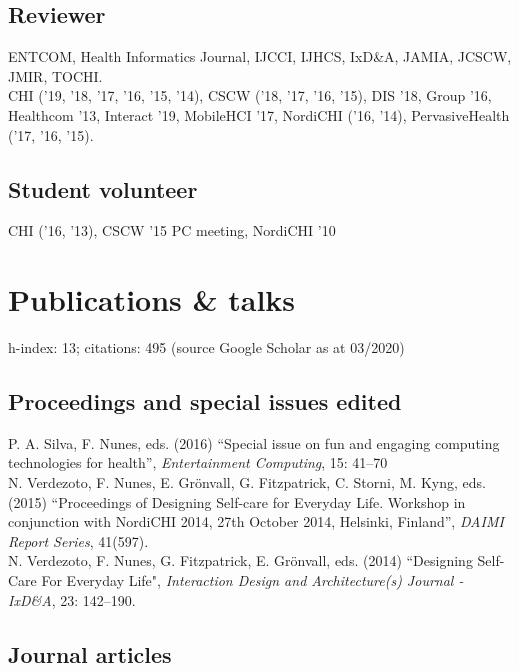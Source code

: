 \documentclass[11pt, a4paper]{article} %
\newcommand{\years}[1]{\marginnote{\scriptsize #1}} %
\begin{document}
\subsection*{Reviewer}

ENTCOM, Health Informatics Journal, IJCCI, IJHCS, IxD\&A, JAMIA, JCSCW, JMIR, TOCHI.\\
CHI ('19, '18, '17, '16, '15, '14), CSCW ('18, '17, '16, '15), DIS '18, Group '16, Healthcom '13, Interact '19, MobileHCI '17, NordiCHI ('16, '14), PervasiveHealth ('17, '16, '15).

\subsection*{Student volunteer}

CHI ('16, '13), CSCW '15 PC meeting, NordiCHI '10

\break





\section*{Publications \& talks}

h-index: 13; citations: 495 (source Google Scholar as at 03/2020)

\subsection*{Proceedings and special issues edited}

\years{2016}P. A. Silva, F. Nunes, eds. (2016) ``Special issue on fun and engaging computing technologies for health'', \emph{Entertainment Computing}, 15: 41--70\\
\years{2015}N. Verdezoto, F. Nunes, E. Grönvall, G. Fitzpatrick, C. Storni, M. Kyng, eds. (2015) ``Proceedings of Designing Self-care for Everyday Life. Workshop in conjunction with NordiCHI 2014, 27th October 2014, Helsinki, Finland'', \emph{DAIMI Report Series}, 41(597).\\
\years{2014}N. Verdezoto, F. Nunes, G. Fitzpatrick, E. Grönvall, eds. (2014) ``Designing Self-Care For Everyday Life", \emph{Interaction Design and Architecture(s) Journal - IxD\&A}, 23: 142--190.

\subsection*{Journal articles}
\end{document}

